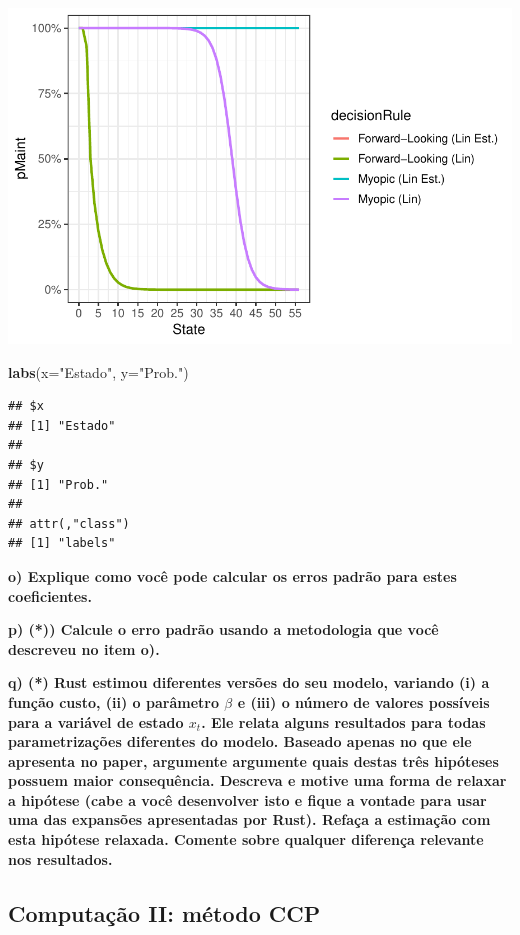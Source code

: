\documentclass[12pt,a4paper]{article}
\newenvironment{Shaded}{\begin{snugshade}}{\end{snugshade}}
\newcommand{\DataTypeTok}[1]{\textcolor[rgb]{0.13,0.29,0.53}{#1}}
\newcommand{\KeywordTok}[1]{\textcolor[rgb]{0.13,0.29,0.53}{\textbf{#1}}}
\newcommand{\NormalTok}[1]{#1}
\newcommand{\StringTok}[1]{\textcolor[rgb]{0.31,0.60,0.02}{#1}}
\begin{document}
\includegraphics{Lista_econometria_II_files/figure-latex/unnamed-chunk-3-2.pdf}

\begin{Shaded}
\begin{Highlighting}[]
  \KeywordTok{labs}\NormalTok{(}\DataTypeTok{x=}\StringTok{"Estado"}\NormalTok{,}
       \DataTypeTok{y=}\StringTok{"Prob."}\NormalTok{)}
\end{Highlighting}
\end{Shaded}

\begin{verbatim}
## $x
## [1] "Estado"
## 
## $y
## [1] "Prob."
## 
## attr(,"class")
## [1] "labels"
\end{verbatim}

\textbf{o) Explique como você pode calcular os erros padrão para estes
coeficientes.}

\textbf{p) (*)) Calcule o erro padrão usando a metodologia que você
descreveu no item o).}

\textbf{q) (*) Rust estimou diferentes versões do seu modelo, variando
(i) a função custo, (ii) o parâmetro \(\beta\) e (iii) o número de
valores possíveis para a variável de estado \(x_t\). Ele relata alguns
resultados para todas parametrizações diferentes do modelo. Baseado
apenas no que ele apresenta no paper, argumente argumente quais destas
três hipóteses possuem maior consequência. Descreva e motive uma forma
de relaxar a hipótese (cabe a você desenvolver isto e fique a vontade
para usar uma das expansões apresentadas por Rust). Refaça a estimação
com esta hipótese relaxada. Comente sobre qualquer diferença relevante
nos resultados.}

\hypertarget{computacao-ii-metodo-ccp}{%
\subsection{Computação II: método CCP}\label{computacao-ii-metodo-ccp}}
\end{document}
